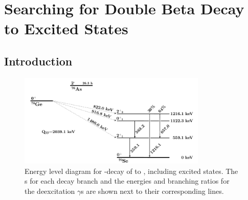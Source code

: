 \documentclass[/main.tex]{subfiles}
\begin{document}
\onlyinsubfile{\textpages}
\chapter{Searching for Double Beta Decay to Excited States} \label{ch:4}

\section{Introduction}

\begin{figure}[h]
  \centering
  \includegraphics[width=0.8\textwidth]{leveldiagram}
  \caption[Energy level diagram for  \bb to ]{\label{fig:Ge76BBLevelDiagram}
    Energy level diagram for \bb-decay of  to , including excited states. The \Qval s for each decay branch and the energies and branching ratios for the deexcitation $\gamma$s are shown next to their corresponding lines.}
\end{figure}
\end{document}
